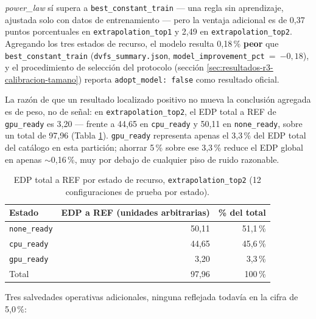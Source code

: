\documentclass[12pt,oneside,spanish]{book}
\begin{document}
\textit{power\_law} sí supera a \texttt{best\_constant\_train} --- una regla sin aprendizaje, ajustada solo con datos de entrenamiento --- pero la ventaja adicional es de 0,37 puntos porcentuales en \texttt{extrapolation\_top1} y 2,49 en \texttt{extrapolation\_top2}. Agregando los tres estados de recurso, el modelo resulta 0,18\,\% \textbf{peor} que \texttt{best\_constant\_train} (\texttt{dvfs\_summary.json}, \texttt{model\_improvement\_pct}~=~$-0{,}18$), y el procedimiento de selección del protocolo (sección \ref{sec:resultados-r3-calibracion-tamano}) reporta \texttt{adopt\_model: false} como resultado oficial.

La razón de que un resultado localizado positivo no mueva la conclusión agregada es de peso, no de señal: en \texttt{extrapolation\_top2}, el EDP total a REF de \texttt{gpu\_ready} es 3,20 --- frente a 44,65 en \texttt{cpu\_ready} y 50,11 en \texttt{none\_ready}, sobre un total de 97,96 (Tabla \ref{tab:r3-peso-edp}). \texttt{gpu\_ready} representa apenas el 3,3\,\% del EDP total del catálogo en esta partición; ahorrar 5\,\% sobre ese 3,3\,\% reduce el EDP global en apenas $\sim$0,16\,\%, muy por debajo de cualquier piso de ruido razonable.

\begin{table}[H]
\centering
\caption[Peso del EDP por estado de recurso]{EDP total a REF por estado de recurso, \texttt{extrapolation\_top2} (12 configuraciones de prueba por estado).}
\label{tab:r3-peso-edp}
\begin{tabular}{lrr}
\toprule
\textbf{Estado} & \textbf{EDP a REF (unidades arbitrarias)} & \textbf{\% del total} \\
\midrule
\texttt{none\_ready} & 50,11 & 51,1\,\% \\
\texttt{cpu\_ready}  & 44,65 & 45,6\,\% \\
\texttt{gpu\_ready}  & 3,20  & 3,3\,\%  \\
\midrule
Total                & 97,96 & 100\,\%  \\
\bottomrule
\end{tabular}
\end{table}

Tres salvedades operativas adicionales, ninguna reflejada todavía en la cifra de 5,0\,\%:
\end{document}

